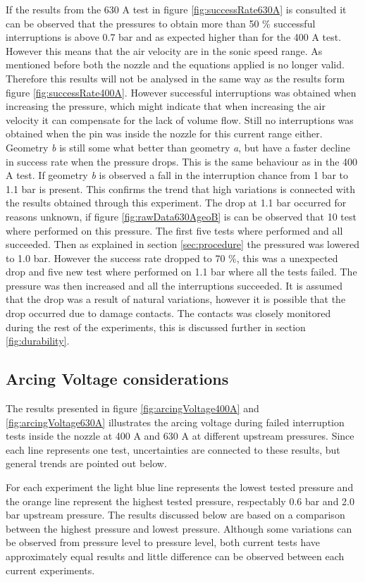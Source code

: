 \documentclass[10pt,a4paper]{article}
\begin{document}
If the results from the 630 A test in figure \ref{fig:successRate630A} is consulted it can be observed that the pressures to obtain more than 50 \% successful interruptions is above 0.7 bar and as expected higher than for the 400 A test. However this means that the air velocity are in the sonic speed range. As mentioned before both the nozzle and the equations applied is no longer valid. Therefore this results will not be analysed in the same way as the results form figure \ref{fig:successRate400A}. However successful interruptions was obtained when increasing the pressure, which might indicate that when increasing the air velocity it can compensate for the lack of volume flow. Still no interruptions was obtained when the pin was inside the nozzle for this current range either. Geometry \textit{b} is still some what better than geometry \textit{a}, but have a faster decline in success rate when the pressure drops. This is the same behaviour as in the 400 A test. If geometry \textit{b} is observed a fall in the interruption chance from 1 bar to 1.1 bar is present. This confirms the trend that high variations is connected with the results obtained through this experiment. The drop at 1.1 bar occurred for reasons unknown, if figure \ref{fig:rawData630AgeoB} is can be observed that 10 test where performed on this pressure. The first five tests where performed and all succeeded. Then as explained in section \ref{sec:procedure} the pressured was lowered to 1.0 bar. However the success rate dropped to 70 \%, this was a unexpected drop and five new test where performed on 1.1 bar where all the tests failed. The pressure was then increased and all the interruptions succeeded. It is assumed that the drop was a result of natural variations, however it is possible that the drop occurred due to damage contacts. The contacts was closely monitored during the rest of the experiments, this is discussed further in section \ref{fig:durability}.

\subsection{Arcing Voltage considerations}
The results presented in figure \ref{fig:arcingVoltage400A} and \ref{fig:arcingVoltage630A} illustrates the arcing voltage during failed interruption tests inside the nozzle at 400 A and 630 A at different upstream pressures. Since each line represents one test, uncertainties are connected to these results, but general trends are pointed out below.

For each experiment the light blue line represents the lowest tested pressure and the orange line represent the highest tested pressure, respectably 0.6 bar and 2.0 bar upstream pressure. The results discussed below are based on a comparison between the highest pressure and lowest pressure. Although some variations can be observed from pressure level to pressure level, both current tests have approximately equal results and little difference can be observed between each current experiments.
\end{document}
